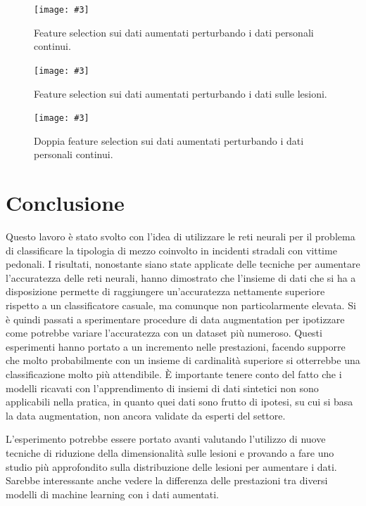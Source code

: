 \documentclass[12pt, twoside, letterpaper]{report}
\newcommand{\img}[4] {
	\begin{figure}
		\centering
		\texttt{[image: \#3]}\\
		\caption{#1}
		\label{fig:#4}
	\end{figure}
}
\begin{document}
			\img{Feature selection sui dati aumentati perturbando i dati personali continui.}{0.5}{feature_selection_1.png}{feature_selection_1}
			\img{Feature selection sui dati aumentati perturbando i dati sulle lesioni.}{0.5}{feature_selection_2.png}{feature_selection_2}
			\img{Doppia feature selection sui dati aumentati perturbando i dati personali continui.}{0.5}{feature_selection_doppia.png}{feature_selection_doppia}

			
			
	\chapter*{Conclusione}	  
		Questo lavoro è stato svolto con l'idea di utilizzare le reti neurali per il problema di classificare la tipologia di mezzo coinvolto in incidenti stradali con vittime pedonali. I risultati, nonostante siano state applicate delle tecniche per aumentare l'accuratezza delle reti neurali, hanno dimostrato che l'insieme di dati che si ha a disposizione permette di raggiungere un'accuratezza nettamente superiore rispetto a un classificatore casuale, ma comunque non particolarmente elevata. Si è quindi passati a sperimentare procedure di data augmentation per ipotizzare come potrebbe variare l'accuratezza con un dataset più numeroso. Questi esperimenti hanno portato a un incremento nelle prestazioni, facendo supporre che molto probabilmente con un insieme di cardinalità superiore si otterrebbe una classificazione molto più attendibile. È importante tenere conto del fatto che i modelli ricavati con l'apprendimento di insiemi di dati sintetici non sono applicabili nella pratica, in quanto quei dati sono frutto di ipotesi, su cui si basa la data augmentation, non ancora validate da esperti del settore.
		
		L'esperimento potrebbe essere portato avanti valutando l'utilizzo di nuove tecniche di riduzione della dimensionalità sulle lesioni e provando a fare uno studio più approfondito sulla distribuzione delle lesioni per aumentare i dati. Sarebbe interessante anche vedere la differenza delle prestazioni tra diversi modelli di machine learning con i dati aumentati.
		
\end{document}
